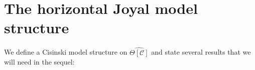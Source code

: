 \documentclass{amsart}
\numberwithin{equation}{section}
\theoremstyle{plain}   %
\newtheorem{prop}[subsection]{Proposition}
\newtheorem{cor}[subsection]{Corollary}
\theoremstyle{remark}
\theoremstyle{plain}
\newcommand{\Nec}{\ensuremath{{\mathcal{N}ec}}}
\newcommand{\overcat}[2]{{\left(#1\downarrow #2\right)}}
\newcommand{\C}{\ensuremath{\mathcal{C}}}
\newcommand{\cellset}{\ensuremath{\widehat{\Theta[\mathcal{C}]}}}
\newcommand{\spsh}{\ensuremath{\operatorname{Psh}_\Delta(\mathcal{C})}}
\begin{document}
\begin{comment}
		When \(\mathcal{G}\) is closed under wedges, we can define the \(\spsh\)-enriched category \(\mathfrak{C}^{\mathcal{G}}(X)	\) to be the category whose objects are the vertices of \(X\) and whose Hom-objects are
		\[\mathfrak{C}^{\mathcal{G}}(X)(x,y)_\cdot.\]
		This defines an enriched category by taking the composition operation to be concatenation of gadgets, which works since \	(\mathcal{G}\) is closed under wedges.
	\end{defn}
	\begin{prop}\label{gadgetlemma}
		Given a \(\C\)-cellular set \(X\) and two vertices \(x,y\) of \(X\) and a category of gadgets \(\mathcal{G}\) the map \	[N\overcat{\Nec^\mathbf{sp}_c}{X_{x,y}} \hookrightarrow N\overcat{\mathcal{G}_c}{X_{x,y}}\] is a weak homotopy 	equivalence.
	\end{prop}
	\begin{proof}
		By Quillen's theorem A, it suffices to look at the overcategories \(\overcat{\Nec^\mathbf{sp}_c}{G(c)}\) along the 	inclusion \(\Nec^\mathbf{sp}_c\hookrightarrow \mathcal{G}_c\) for all \(G\) in \(\mathcal{G}\) and show that their nerves 	are contractible, but these overcategories correspond on-the-nose to the subcategories classifying the diagonal component 	of \(\mathfrak{C}^\Nec(G)(\alpha,\omega)\), which is contractible because \(G\) is a gadget.
	\end{proof}
	\begin{cor}
		The constructions \(\mathfrak{C}^\Nec\) and \(\mathfrak{C}^\mathcal{G}\) are naturally weakly equivalent when \(\mathcal	{G}\) is closed under wedges.
	\end{cor}
	\begin{proof}
		The map between the two constructions is the identity on objects and induces Hom-wise weak equivalences of simplicial 	presheaves.
	\end{proof}
\end{comment}

\section{The horizontal Joyal model structure}
We define a Cisinski model structure on \(\cellset\) and state several results that we will need in the sequel:
\end{document}
